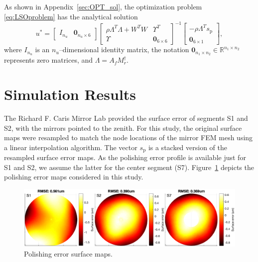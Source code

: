 \documentclass{gmto}
\begin{document}
As shown in Appendix~\ref{sec:OPT_sol}, the optimization problem \eqref{eq:LSOproblem} has the analytical solution
\begin{equation}
\label{eq:LSOsol}
u^\ast = 
\begin{bmatrix}
I_{n_u} & \mathbf{0}_{n_u \times 6}
\end{bmatrix}
\begin{bmatrix}
\rho \Lambda^T\Lambda + W^TW & \Upsilon^T \\ \Upsilon & \mathbf{0}_{6 \times 6}
\end{bmatrix}^{-1} \begin{bmatrix}
- \rho \Lambda^T s_{\text{p}} \\ \mathbf{0}_{6 \times 1}
\end{bmatrix},
\end{equation}
where $I_{n_u}$ is an $n_u$--dimensional identity matrix, the notation $\mathbf{0}_{n_1 \times n_2} \in \mathbb{R}^{n_1 \times n_2}$ represents zero matrices, and $\Lambda = A_f M_r^\dagger$.


\section{Simulation Results}
\label{sec:simulations}

The Richard F. Caris Mirror Lab provided the surface error of segments \textsf{S1} and \textsf{S2}, with the mirrors pointed to the zenith. For this study, the original surface maps were resampled to match the node locations of the mirror FEM mesh using a linear interpolation algorithm. The vector $s_{\text{p}}$ is a stacked version of the resampled surface error maps. As the polishing error profile is available just for \textsf{S1} and \textsf{S2}, we assume the latter for the center segment (\textsf{S7}). Figure~\ref{fig:pol_error_maps} depicts the polishing error maps considered in this study.
%
\begin{figure}[!hbt]
    \vspace{6pt}
    \centering
    \includegraphics[width=\textwidth]{./pictures/polishing_errorS127.eps}
    \caption{Polishing error surface maps.}
    \label{fig:pol_error_maps}
\end{figure}
\end{document}
